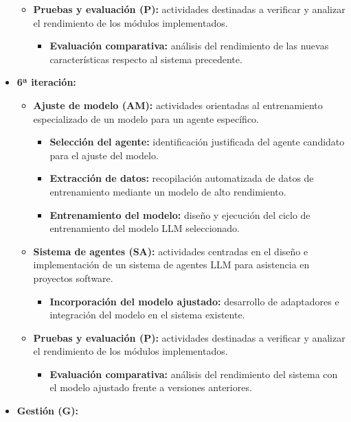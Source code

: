 \begin{itemize}
\begin{itemize}
\begin{itemize}
        \end{itemize}
      \item\textbf{Pruebas y evaluación (P):} actividades destinadas a verificar y analizar el rendimiento de los módulos implementados.
        \begin{itemize}
          \item\textbf{Evaluación comparativa: } análisis del rendimiento de las nuevas características respecto al sistema precedente.
        \end{itemize}
    \end{itemize}
  \item\textbf{6ª iteración:}
    \begin{itemize}
      \item\textbf{Ajuste de modelo (AM):} actividades orientadas al entrenamiento especializado de un modelo para un agente específico.
      \begin{itemize}
        \item\textbf{Selección del agente:} identificación justificada del agente candidato para el ajuste del modelo.
        \item\textbf{Extracción de datos:} recopilación automatizada de datos de entrenamiento mediante un modelo de alto rendimiento.
        \item\textbf{Entrenamiento del modelo:} diseño y ejecución del ciclo de entrenamiento del modelo LLM seleccionado.
      \end{itemize}
      \item\textbf{Sistema de agentes (SA):} actividades centradas en el diseño e implementación de un sistema de agentes LLM para asistencia en proyectos software.
        \begin{itemize}
          \item\textbf{Incorporación del modelo ajustado:} desarrollo de adaptadores e integración del modelo en el sistema existente.
        \end{itemize}
      \item\textbf{Pruebas y evaluación (P):} actividades destinadas a verificar y analizar el rendimiento de los módulos implementados.
        \begin{itemize}
          \item\textbf{Evaluación comparativa: } análisis del rendimiento del sistema con el modelo ajustado frente a versiones anteriores.
        \end{itemize}
    \end{itemize}
  \item\textbf{Gestión (G):} 

\end{itemize}
